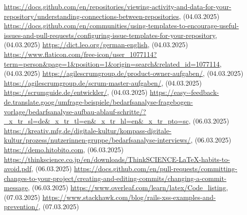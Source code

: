 \renewcommand\bibname{Quellenverzeichnis}
\begin{thebibliography}{9}
     \url{https://docs.github.com/en/repositories/viewing-activity-and-data-for-your-repository/understanding-connections-between-repositories}, (04.03.2025)
     \url{https://docs.github.com/en/communities/using-templates-to-encourage-useful-issues-and-pull-requests/configuring-issue-templates-for-your-repository}, (04.03.2025)
     \url{https://dict.leo.org/german-english}, (04.03.2025)
     \url{https://www.flaticon.com/free-icon/user_1077114?term=person&page=1&position=1&origin=search&related_id=1077114}, (04.03.2025)
     \url{https://agilescrumgroup.de/product-owner-aufgaben/}, (04.03.2025)
     \url{https://agilescrumgroup.de/scrum-master-aufgaben/}, (04.03.2025)
     \url{https://scrumguide.de/entwickler/}, (04.03.2025)
     \url{https://easy--feedback-de.translate.goog/umfrage-beispiele/bedarfsanalyse-fragebogen-vorlage/bedarfsanalyse-aufbau-ablauf-schritte/?_x_tr_sl=de&_x_tr_tl=en&_x_tr_hl=en&_x_tr_pto=sc}, (06.03.2025)
     \url{https://kreativ.mfg.de/digitale-kultur/kompass-digitale-kultur/prozess/nutzerinnen-gruppe/bedarfsanalyse-interviews/}, (06.03.2025)
     \url{https://demo.hitobito.com}, (06.03.2025)
     \url{https://thinkscience.co.jp/en/downloads/ThinkSCIENCE-LaTeX-habits-to-avoid.pdf}, (06.03.2025)
     \url{https://docs.github.com/en/pull-requests/committing-changes-to-your-project/creating-and-editing-commits/changing-a-commit-message}, (06.03.2025)
     \url{https://www.overleaf.com/learn/latex/Code_listing}, (07.03.2025)
     \url{https://www.stackhawk.com/blog/rails-xss-examples-and-prevention/}, (07.03.2025)
    
\end{thebibliography}

